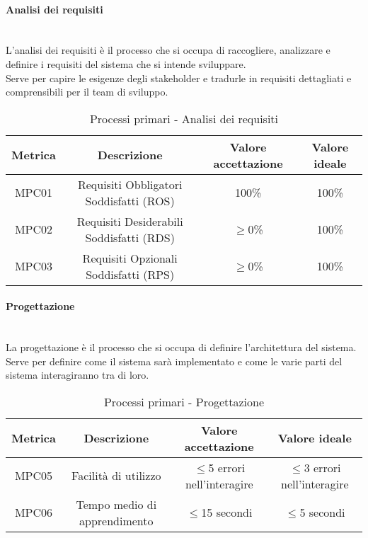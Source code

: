 \documentclass[11pt]{article}
\begin{document}
\begin{justify}
\paragraph{Analisi dei requisiti}\mbox{}\\
L'analisi dei requisiti è il processo che si occupa di raccogliere, analizzare e definire i requisiti del sistema che si intende sviluppare.\\
Serve per capire le esigenze degli stakeholder e tradurle in requisiti dettagliati e comprensibili per il team di sviluppo.\\
\begin{table}[H]
  \centering
\begin{tabular}{|c|c|c|c|}
  \hline
  \textbf{Metrica} & \textbf{Descrizione} & \textbf{Valore accettazione} & \textbf{Valore ideale}\\
  \hline
  MPC01 & Requisiti Obbligatori Soddisfatti (ROS) & 100\% & 100\%\\
  \hline
  MPC02 & Requisiti Desiderabili Soddisfatti (RDS) & $\geq$0\% & 100\% \\
  \hline
  MPC03 & Requisiti Opzionali Soddisfatti (RPS) & $\geq$0\% & 100\% \\
  \hline
\end{tabular}
\caption{Processi primari - Analisi dei requisiti}
\label{tab:analisi dei requisiti}
\end{table}
\paragraph{Progettazione}\mbox{}\\
La progettazione è il processo che si occupa di definire l'architettura del sistema.\\
Serve per definire come il sistema sarà implementato e come le varie parti del sistema interagiranno tra di loro.\\
\begin{table}[H]
  \centering
\begin{tabular}{|c|c|c|c|}
  \hline
  \textbf{Metrica} & \textbf{Descrizione} & \textbf{Valore accettazione} & \textbf{Valore ideale}\\
  \hline
  MPC05 & Facilità di utilizzo & $\leq$5 errori nell'interagire & $\leq$3 errori nell'interagire  \\
  \hline
  MPC06 & Tempo medio di apprendimento & $\leq$15 secondi & $\leq$5 secondi \\
  \hline
\end{tabular}
\caption{Processi primari - Progettazione}
\label{tab:progettazione}
\end{table}


\end{justify}
\end{document}
